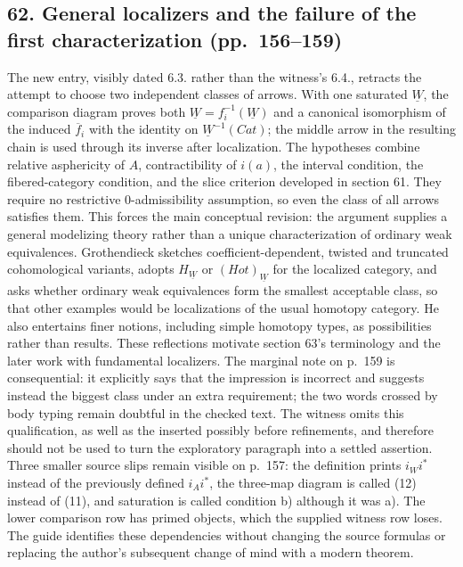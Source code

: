 \documentclass[10pt,oneside]{book}
\begin{document}
\subsection*{62. General localizers and the failure of the first characterization (pp.~156--159)}
The new entry, visibly dated 6.3. rather than the witness's 6.4., retracts the attempt to choose two independent classes of arrows. With one saturated $\underline W$, the comparison diagram proves both $\underline W=f_i^{-1}(\underline W)$ and a canonical isomorphism of the induced $\overline f_i$ with the identity on $\underline W^{-1}(Cat)$; the middle arrow in the resulting chain is used through its inverse after localization. The hypotheses combine relative asphericity of $A$, contractibility of $i(a)$, the interval condition, the fibered-category condition, and the slice criterion developed in section 61. They require no restrictive 0-admissibility assumption, so even the class of all arrows satisfies them. This forces the main conceptual revision: the argument supplies a general modelizing theory rather than a unique characterization of ordinary weak equivalences. Grothendieck sketches coefficient-dependent, twisted and truncated cohomological variants, adopts $H_{\underline W}$ or $(Hot)_{\underline W}$ for the localized category, and asks whether ordinary weak equivalences form the smallest acceptable class, so that other examples would be localizations of the usual homotopy category. He also entertains finer notions, including simple homotopy types, as possibilities rather than results. These reflections motivate section 63's terminology and the later work with fundamental localizers. The marginal note on p.~159 is consequential: it explicitly says that the impression is incorrect and suggests instead the biggest class under an extra requirement; the two words crossed by body typing remain doubtful in the checked text. The witness omits this qualification, as well as the inserted possibly before refinements, and therefore should not be used to turn the exploratory paragraph into a settled assertion. Three smaller source slips remain visible on p.~157: the definition prints $i_Wi^*$ instead of the previously defined $i_Ai^*$, the three-map diagram is called (12) instead of (11), and saturation is called condition b) although it was a). The lower comparison row has primed objects, which the supplied witness row loses. The guide identifies these dependencies without changing the source formulas or replacing the author's subsequent change of mind with a modern theorem.
\end{document}
